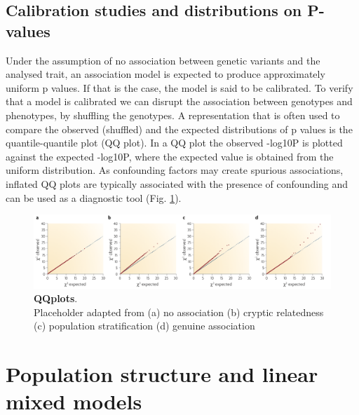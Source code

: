 \subsection{Calibration studies and distributions on P-values}

Under the assumption of no association between genetic variants and the analysed trait, an association model is expected to produce approximately uniform p values.
If that is the case, the model is said to be calibrated.
To verify that a model is calibrated we can disrupt the association between genotypes and phenotypes, by shuffling the genotypes. 
A representation that is often used to compare the observed (shuffled) and the expected distributions of p values is the quantile-quantile plot (QQ plot). 
In a QQ plot the observed -log10P is plotted against the expected -log10P, where the expected value is obtained from the uniform distribution. 
As confounding factors may create spurious associations, inflated QQ plots are typically associated with the presence of confounding and can be used as a diagnostic tool (Fig. \ref{fig:qqplots}). 

\begin{figure}[h]
\centering
\includegraphics[width=15cm]{Chapter2/Fig/qqplots.png}
\caption[\textbf{QQplots}]{\textbf{QQplots}.\\
Placeholder adapted from \cite{mccarthy2008genome}
(a) no association (b) cryptic relatedness (c) population stratification (d) genuine association}
\label{fig:qqplots}
\end{figure}



\section{Population structure and linear mixed models}

